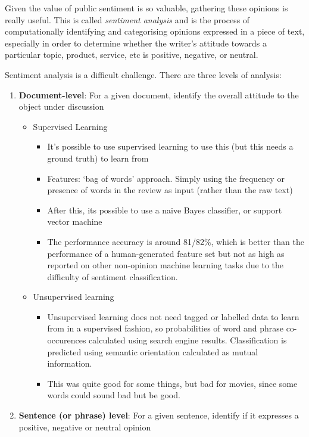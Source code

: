 \documentclass[11pt,a4paper,titlepage,dvipsnames,cmyk]{scrartcl}
\begin{document}
Given the value of public sentiment is so valuable, gathering these opinions is really useful. This is called \textit{sentiment analysis} and is the process of computationally identifying and categorising opinions expressed in a piece of text, especially in order to determine whether the writer's attitude towards a particular topic, product, service, etc is positive, negative, or neutral.

Sentiment analysis is a difficult challenge. There are three levels of analysis:
\begin{enumerate}
\item \textbf{Document-level}: For a given document, identify the overall attitude to the object under discussion
\begin{itemize}
    \item Supervised Learning
    \begin{itemize}
        \item It's possible to use supervised learning to use this (but this needs a ground truth) to learn from
        \item Features: `bag of words' approach. Simply using the frequency or presence of words in the review as input (rather than the raw text)
        \item After this, its possible to use a naive Bayes classifier, or support vector machine
        \item The performance accuracy is around 81/82\%, which is better than the performance of a human-generated feature set but not as high as reported on other non-opinion machine learning tasks due to the difficulty of sentiment classification.
    \end{itemize}
    \item Unsupervised learning
    \begin{itemize}
        \item Unsupervised learning does not need tagged or labelled data to learn from in a supervised fashion, so probabilities of word and phrase co-occurences calculated using search engine results. Classification is predicted using semantic orientation calculated as mutual information.
        \item This was quite good for some things, but bad for movies, since some words could sound bad but be good.
    \end{itemize}
\end{itemize}
\item \textbf{Sentence (or phrase) level}: For a given sentence, identify if it expresses a positive, negative or neutral opinion

\end{enumerate}
\end{document}

